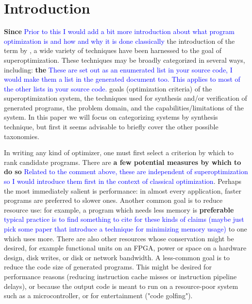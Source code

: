 \documentclass[12pt,twoside]{reedthesis}
\newcommand{\comment}[2]{\textbf{#1} \textcolor{blue}{#2}}
\begin{document}
\chapter*{Introduction} %
    \singlespacing %


\comment{Since}{Prior to this I would add a bit more introduction about what program optimization is and how and why it is done classically} the introduction of the term by \cite{massalin1987superoptimizer}, a wide variety of techniques have been harnessed to the goal of superoptimization.
These techniques may be broadly categorized in several ways, including:
    \comment{the}{These are set out as an enumerated list in your source code, I would make them a list in the generated document too. This applies to most of the other lists in your source code.} goals (optimization criteria) of the superoptimization system,
    the techniques used for synthesis and/or verification of generated programs,
    the problem domain,
    and the capabilities/limitations of the system.
In this paper we will focus on categorizing systems by synthesis technique, but first it seems advisable to briefly cover the other possible taxonomies.

In writing any kind of optimizer, one must first select a criterion by which to rank candidate programs.
There are \comment{a few potential measures by which to do so}{Related to the comment above, these are independent of superoptimization so I would introduce them first in the context of classical optimization}.
Perhaps the most immediately salient is performance: 
    in almost every application, faster programs are preferred to slower ones.
Another common goal is to reduce resource use: 
    for example, a program which needs less memory is \comment{preferable}{typical practice is to find something to cite for these kinds of claims (maybe just pick some paper that introduce a technique for minimizing memory usage)} to one which uses more.
There are also other resources whose conservation might be desired, for example 
    functional units on an FPGA, 
    power or space on a hardware design, 
    disk writes, 
    or disk or network bandwidth.
A less-common goal is to reduce the code size of generated programs.
    This might be desired for 
        performance reasons (reducing instruction cache misses or instruction pipeline delays), 
        or because the output code is meant to run on a resource-poor system such as a microcontroller, 
        or for entertainment ("code golfing").
\end{document}
